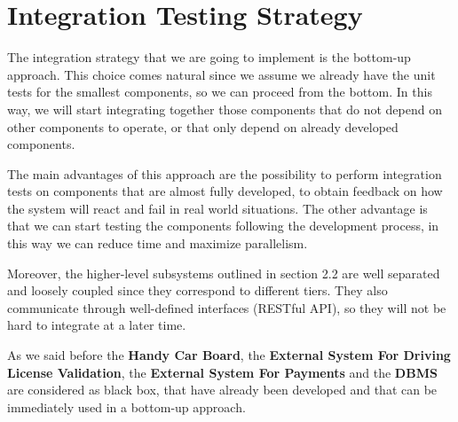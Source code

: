 \section{Integration Testing Strategy}
The integration strategy that we are going to implement is the bottom-up approach. This choice
comes natural since we assume we already have the unit tests for the smallest
components, so we can proceed from the bottom. In this way, we will start integrating together those components that do not depend on other components to operate, or that
only depend on already developed components.

The main advantages of this approach are the possibility to perform integration tests on components that are almost fully developed, to obtain feedback on how the system will react and fail in real world situations. The other advantage is that we can start testing the components following the development process, in this way we can reduce time and maximize parallelism.

Moreover, the higher-level subsystems outlined in section 2.2 are well
separated and loosely coupled since they correspond to different tiers. They
also communicate through well-defined interfaces (RESTful API), so
they will not be hard to integrate at a later time.

As we said before the \textbf{Handy Car Board}, the \textbf{External System For Driving License Validation}, the \textbf{External System For Payments} and the \textbf{DBMS} are considered as black box, that have already been developed and that can be immediately used in a bottom-up approach.

